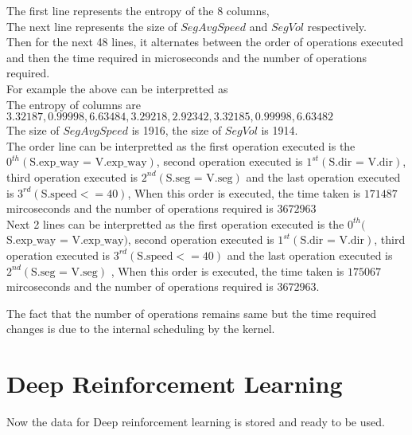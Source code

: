The first line represents the entropy of the $8$ columns,\\
The next line represents the size of $SegAvgSpeed$ and $SegVol$ respectively.\\
Then for the next 48 lines, it alternates between the order of operations executed and then the time required in microseconds and the number of operations required.\\
For example the above can be interpretted as\\
The entropy of columns are $3.32187,0.99998,6.63484,3.29218,2.92342,3.32185,0.99998,6.63482$\\
The size of $SegAvgSpeed$ is 1916, the size of $SegVol$ is 1914.\\
The order line can be interpretted as the first operation executed is the $0^{th}(\text{S.exp\_way = V.exp\_way})$, second operation executed is $1^{st}(\text{S.dir = V.dir})$, third operation executed is $2^{nd}(\text{S.seg = V.seg})$ and the last operation executed is $3^{rd}(\text{S.speed} <= 40)$, When this order is executed, the time taken is $171487$ mircoseconds and the number of operations required is $3672963$\\
Next 2 lines can be interpretted as the first operation executed is the $0^{th}($$\text{S.exp\_way = V.exp\_way})$, second operation executed is $1^{st}(\text{S.dir = V.dir})$, third operation executed is $3^{rd}(\text{S.speed} <= 40)$ and the last operation executed is $2^{nd}(\text{S.seg = V.seg})$ , When this order is executed, the time taken is $175067$ mircoseconds and the number of operations required is $3672963$. 
\par The fact that the number of operations remains same but the time required changes is due to the internal scheduling by the kernel.
 
\section{Deep Reinforcement Learning}
Now the data for Deep reinforcement learning is stored and ready to be used.  
\begin{lstlisting}[language=Python]
\end{lstlisting}
\begin{lstlisting}[language=Python]
\end{lstlisting}
